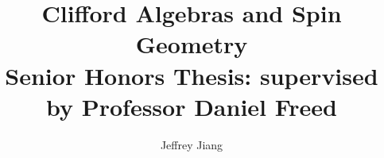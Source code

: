 \documentclass[reqno]{amsbook}
\theoremstyle{definition}
\theoremstyle{remark}
\numberwithin{equation}{chapter}
\begin{document}
\frontmatter
%
\author{Jeffrey Jiang}
%
\title{Clifford Algebras and Spin Geometry \\
\large Senior Honors Thesis: supervised by Professor Daniel Freed}
%
%
\maketitle
%
\tableofcontents
%
\mainmatter
%

%

%

%

%
%
%

%

%

%

%

%

%

%
\nocite{*}
\printbibliography
%
\end{document}
